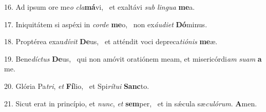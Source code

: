 16. Ad ipsum ore me\textit{o} \textit{cla}\textbf{má}vi, \ast\  et exaltávi \textit{sub} \textit{lin}\textit{gua} \textbf{me}a.\

17. Iniquitátem si aspéxi in \textit{cor}\textit{de} \textbf{me}o, \ast\  non ex\textit{áu}\textit{di}\textit{et} \textbf{Dó}minus.\

18. Proptérea exau\textit{dí}\textit{vit} \textbf{De}us, \ast\  et atténdit voci depreca\textit{ti}\textit{ó}\textit{nis} \textbf{me}æ.\

19. Bene\textit{díc}\textit{tus} \textbf{De}us, \ast\  qui non amóvit oratiónem meam, et misericórdi\textit{am} \textit{su}\textit{am} \textbf{a} me.\

20. Glória Pa\textit{tri}, \textit{et} \textbf{Fí}lio, \ast\  et Spi\textit{rí}\textit{tu}\textit{i} \textbf{Sanc}to.\

21. Sicut erat in princípio, et \textit{nunc}, \textit{et} \textbf{sem}per, \ast\  et in sǽcula sæ\textit{cu}\textit{ló}\textit{rum}. \textbf{A}men.\


